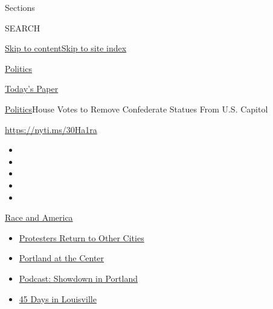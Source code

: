 Sections

SEARCH

\protect\hyperlink{site-content}{Skip to
content}\protect\hyperlink{site-index}{Skip to site index}

\href{https://www.nytimes3xbfgragh.onion/section/politics}{Politics}

\href{https://myaccount.nytimes3xbfgragh.onion/auth/login?response_type=cookie\&client_id=vi}{}

\href{https://www.nytimes3xbfgragh.onion/section/todayspaper}{Today's
Paper}

\href{/section/politics}{Politics}\textbar{}House Votes to Remove
Confederate Statues From U.S. Capitol

\url{https://nyti.ms/30Ha1ra}

\begin{itemize}
\item
\item
\item
\item
\item
\end{itemize}

\href{https://www.nytimes3xbfgragh.onion/news-event/george-floyd-protests-minneapolis-new-york-los-angeles?action=click\&pgtype=Article\&state=default\&region=TOP_BANNER\&context=storylines_menu}{Race
and America}

\begin{itemize}
\tightlist
\item
  \href{https://www.nytimes3xbfgragh.onion/2020/07/26/us/protests-portland-seattle-trump.html?action=click\&pgtype=Article\&state=default\&region=TOP_BANNER\&context=storylines_menu}{Protesters
  Return to Other Cities}
\item
  \href{https://www.nytimes3xbfgragh.onion/2020/07/24/us/portland-oregon-protests-white-race.html?action=click\&pgtype=Article\&state=default\&region=TOP_BANNER\&context=storylines_menu}{Portland
  at the Center}
\item
  \href{https://www.nytimes3xbfgragh.onion/2020/07/23/podcasts/the-daily/portland-protests.html?action=click\&pgtype=Article\&state=default\&region=TOP_BANNER\&context=storylines_menu}{Podcast:
  Showdown in Portland}
\item
  \href{https://www.nytimes3xbfgragh.onion/interactive/2020/07/16/us/black-lives-matter-protests-louisville-breonna-taylor.html?action=click\&pgtype=Article\&state=default\&region=TOP_BANNER\&context=storylines_menu}{45
  Days in Louisville}
\end{itemize}

